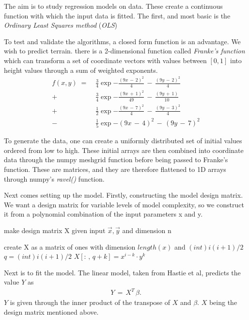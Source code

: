 \documentclass[ 12pt, a4paper ]{article}
\begin{document}
The aim is to study regression models on data. These create a continuous function with which
the input data is fitted. The first, and most basic is the \textit{Ordinary Least Squares method} 
(\textit{OLS})

To test and validate the algorithms, a closed form function is an advantage. We wish to predict
terrain. there is a 2-dimensional function called \textit{Franke's function} which can 
transform a set of coordinate vectors with values between $[0, 1]$ into height values through 
a sum of weighted exponents. 
\begin{align}
    f(x, y) \;=\; 
        &\frac{3}{4} \exp{ - \frac{(9x \,-\, 2)^2}{4}    \,-\, \frac{(9y \,-\, 2)^2}{4} }
    \nonumber \\
    +   &\frac{3}{4} \exp{ - \frac{(9x \,+\, 1)^2}{49}   \,-\, \frac{(9y \,+\, 1)  }{10} }
    \nonumber \\
    +   &\frac{1}{2} \exp{ - \frac{(9x \,-\, 7)^2}{4}    \,-\, \frac{(9y \,-\, 3)^2}{4} }
    \nonumber \\
    -   &\frac{1}{5} \exp{ -       (9x \,-\, 4)^2        \,-\,       (9y \,-\, 7)^2     }
    \label{eq:franke}
\end{align}

To generate the data, one can create a uniformly distributed set of initial values ordered 
from low to high. These initial arrays are then combined into coordinate data through the 
numpy meshgrid function before being passed to Franke's function. These are matrices, and 
they are therefore flattened to 1D arrays through numpy's \textit{ravel()} function.

Next comes setting up the model. Firstly, constructing the model design matrix. We want a
design matrix for variable levels of model complexity, so we construct it from a polynomial
combination of the input parameters x and y. 
\begin{algorithm}
\caption{make design matrix X given input $\vec{x}, \vec{y}$ and dimension n}
\begin{algorithmic}
\STATE  create X as a matrix of ones with dimension $length(x)$ and $(int) i(i+1)/2$
\STATE $q = (int) i(i+1)/2$
\STATE $X[:\,,\,q+k] = x^{i - k} \cdot y^k $
\ENDFOR
\ENDFOR
\end{algorithmic}
\label{alg:design}
\end{algorithm}

Next is to fit the model. The linear model, taken from Hastie et al, predicts the 
value $Y$ as 
\begin{align}
    Y \,=\, X^T \, \beta.
\end{align}
$Y$ is given through the inner product of the transpose of $X$ and $\beta$.
$X$ being the design matrix mentioned above. 
\end{document}
